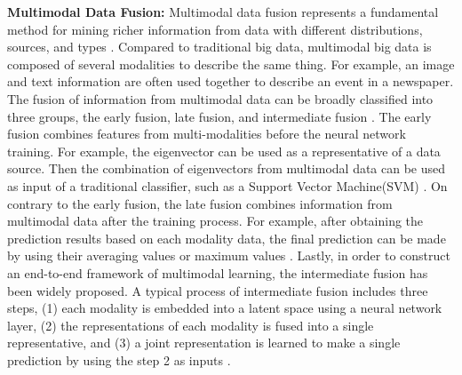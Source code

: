 \textbf{Multimodal Data Fusion:} Multimodal data fusion represents a fundamental
method for mining richer information from data with different distributions,
sources, and types \cite{Lv2017NextGeneration}. Compared to traditional big
data, multimodal big data is composed of several modalities to describe the same
thing. For example, an image and text information are often used together to
describe an event in a newspaper. The fusion of information from multimodal data
can be broadly classified into three groups, the early fusion, late fusion, and
intermediate fusion \cite{Gaw2022Multimodal}. The early fusion combines features
from multi-modalities before the neural network training. For example, the
eigenvector can be used as a representative of a data source. Then the
combination of eigenvectors from multimodal data can be used as input of a
traditional classifier, such as a Support Vector Machine(SVM)
\cite{Liu2017Deep}. On contrary to the early fusion, the late fusion combines
information from multimodal data after the training process. For example, after
obtaining the prediction results based on each modality data, the final
prediction can be made by using their averaging values or maximum values
\cite{Ramachandram2017Deep}. Lastly, in order to construct an end-to-end
framework of multimodal learning, the intermediate fusion has been widely
proposed. A typical process of intermediate fusion includes three steps, (1)
each modality is embedded into a latent space using a neural network layer, (2)
the representations of each modality is fused into a single representative, and
(3) a joint representation is learned to make a single prediction by using the
step 2 as inputs \cite{Gaw2022Multimodal}.